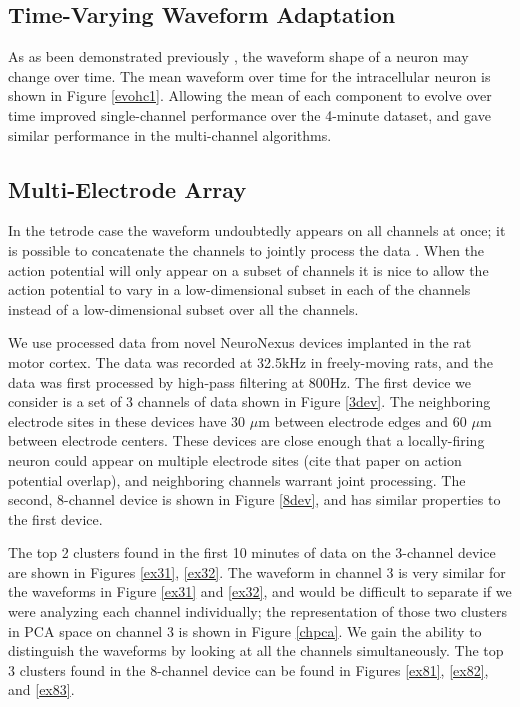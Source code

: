 \subsection{Time-Varying Waveform Adaptation} \label{sub:adapt}
As as been demonstrated previously \cite{calabrese2011kalman}, the waveform shape of a neuron may change over time.  The mean waveform over time for the intracellular neuron is shown in Figure \ref{evohc1}.  Allowing the mean of each component to evolve over time improved single-channel performance over the 4-minute dataset, and gave similar performance in the multi-channel algorithms.



\subsection{Multi-Electrode Array} \label{sub:multi}

In the tetrode case the waveform undoubtedly appears on all channels at once; it is possible to concatenate the channels to jointly process the data \cite{wood2009}.  When the action potential will only appear on a subset of channels it is nice to allow the action potential to vary in a low-dimensional subset in each of the channels instead of a low-dimensional subset over all the channels. \cite{Prentice2011}

We use processed data from novel NeuroNexus devices implanted in the rat motor cortex.  The data was recorded at 32.5kHz in freely-moving rats, and the data was first processed by high-pass filtering at 800Hz.  The first device we consider is a set of 3 channels of data shown in Figure \ref{3dev}.  The neighboring electrode sites in these devices have 30 $\mu$m between electrode edges and 60 $\mu$m between electrode centers.  These devices are close enough that a locally-firing neuron could appear on multiple electrode sites (cite that paper on action potential overlap), and neighboring channels warrant joint processing.  The second, 8-channel device is shown in Figure \ref{8dev}, and has similar properties to the first device.

 The top 2 clusters found in the first 10 minutes of data on the 3-channel device are shown in Figures \ref{ex31}, \ref{ex32}.  The waveform in channel 3 is very similar for the waveforms in Figure \ref{ex31} and \ref{ex32}, and would be difficult to separate if we were analyzing each channel individually; the representation of those two clusters in PCA space on channel 3 is shown in Figure \ref{chpca}.  We gain the ability to distinguish the waveforms by looking at all the channels simultaneously.  The top 3 clusters found in the 8-channel device can be found in Figures \ref{ex81}, \ref{ex82}, and \ref{ex83}.

